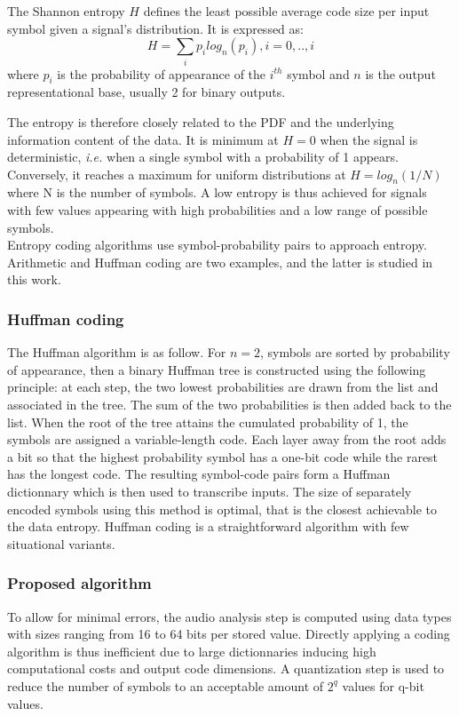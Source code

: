 \documentclass[12pt,times,onecolumn]{article}
\begin{document}
The Shannon entropy $H$ defines the least possible average code size per input symbol given a signal's distribution. It is expressed as:
\begin{equation}
H = \sum\limits_i p_ilog_n(p_i), i = 0,..,i
\end{equation}
where $p_i$ is the probability of appearance of the $i^{th}$ symbol and $n$ is the output representational base, usually 2 for binary outputs.

The entropy is therefore closely related to the PDF and the underlying information content of the data. It is minimum at $H = 0$ when the signal is deterministic, \textit{i.e.} when a single symbol with a probability of 1 appears. Conversely, it reaches a maximum for uniform distributions at $H = log_n(1/N)$ where N is the number of symbols. A low entropy is thus achieved for signals with few values appearing with high probabilities and a low range of possible symbols.\\

Entropy coding algorithms use symbol-probability pairs to approach entropy. Arithmetic \cite{witten1987} and Huffman \cite{huffman1952} coding are two examples, and the latter is studied in this work.

\subsubsection{Huffman coding}
The Huffman algorithm is as follow. For $n = 2$, symbols are sorted by probability of appearance, then a binary Huffman tree is constructed using the following principle: at each step, the two lowest probabilities are drawn from the list and associated in the tree. The sum of the two probabilities is then added back to the list. When the root of the tree attains the cumulated probability of 1, the symbols are assigned a variable-length code. Each layer away from the root adds a bit so that the highest probability symbol has a one-bit code while the rarest has the longest code. The resulting symbol-code pairs form a Huffman dictionnary which is then used to transcribe inputs. The size of separately encoded symbols using this method is optimal, that is the closest achievable to the data entropy. Huffman coding is a straightforward algorithm with few situational variants.

\subsubsection{Proposed algorithm}
To allow for minimal errors, the audio analysis step is computed using data types with sizes ranging from 16 to 64 bits per stored value. Directly applying a coding algorithm is thus inefficient due to large dictionnaries inducing high computational costs and output code dimensions. A quantization step is used to reduce the number of symbols to an acceptable amount of $2^q$ values for q-bit values.\\
\end{document}
